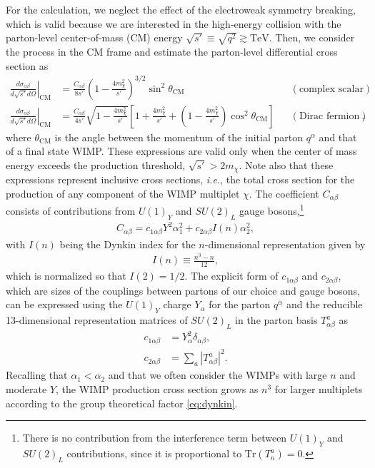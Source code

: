 \documentclass[12pt,twoside,book]{article}
\begin{document}
For the calculation, we neglect the effect of the electroweak symmetry breaking, which is valid because we are interested in the high-energy collision with the parton-level center-of-mass (CM) energy $\sqrt{s'} \equiv \sqrt{q^2} \gtrsim \mathrm{TeV}$.
Then, we consider the process in the CM frame and estimate the parton-level differential cross section as
\begin{align}
  \left. \frac{d \sigma_{\alpha \beta}}{d \sqrt{s'} d \Omega} \right|_{\text{CM}}
  &= \frac{C_{\alpha \beta}}{8 s'} \left( 1 - \frac{4 m_\chi^2}{s'} \right)^{3/2} \sin^2 \theta_{\mathrm{CM}}
  & &(\text{complex scalar}) \label{eq:parton_cross_section_scalar} \\
  \left. \frac{d \sigma_{\alpha \beta}}{d \sqrt{s'} d \Omega} \right|_{\text{CM}}
  &= \frac{C_{\alpha \beta}}{4 s'} \sqrt{1 - \frac{4 m_\chi^2}{s'}}
  \left[ 1 + \frac{4 m_\chi^2}{s'} + \left( 1 - \frac{4 m_\chi^2}{s'} \right) \cos^2 \theta_{\mathrm{CM}} \right]
  & &(\text{Dirac fermion}), \label{eq:parton_cross_section_fermion}
\end{align}
where $\theta_{\mathrm{CM}}$ is the angle between the momentum of the initial parton $q^\alpha$ and that of a final state WIMP.
These expressions are valid only when the center of mass energy exceeds the production threshold, $\sqrt{s'} > 2m_\chi$.
Note also that these expressions represent inclusive cross sections, \textit{i.e.}, the total cross section for the production of any component of the WIMP multiplet $\chi$.
The coefficient $C_{\alpha \beta}$ consists of contributions from $U(1)_Y$ and $SU(2)_L$ gauge bosons,\footnote
{
  There is no contribution from the interference term between $U(1)_Y$ and $SU(2)_L$ contributions, since it is proportional to $\mathrm{Tr} (T^a_n) = 0$.
}
\begin{align}
  C_{\alpha \beta} = c_{1 \alpha \beta} Y^2 \alpha_1^2
  + c_{2 \alpha \beta} I(n) \alpha_2^2,
\end{align}
with $I(n)$ being the Dynkin index for the $n$-dimensional representation given by
\begin{align}
  I(n) \equiv \frac{n^3-n}{12},
  \label{eq:dynkin}
\end{align}
which is normalized so that $I(2) = 1/2$.
The explicit form of $c_{1 \alpha \beta}$ and $c_{2 \alpha \beta}$, which are sizes of the couplings between partons of our choice and gauge bosons, can be expressed using the $U(1)_Y$ charge $Y_\alpha$ for the parton $q^\alpha$ and the reducible 13-dimensional representation matrices of $SU(2)_L$ in the parton basis $T^a_{\alpha \beta}$ as
\begin{align}
  c_{1 \alpha \beta} &= Y_\alpha^2 \delta_{\alpha \beta},\\
  c_{2 \alpha \beta} &= \sum_a \left| T^a_{\alpha \beta} \right|^2.
\end{align}
Recalling that $\alpha_1 < \alpha_2$ and that we often consider the WIMPs with large $n$ and moderate $Y$, the WIMP production cross section grows as $n^3$ for larger multiplets according to the group theoretical factor \eqref{eq:dynkin}.
\end{document}
